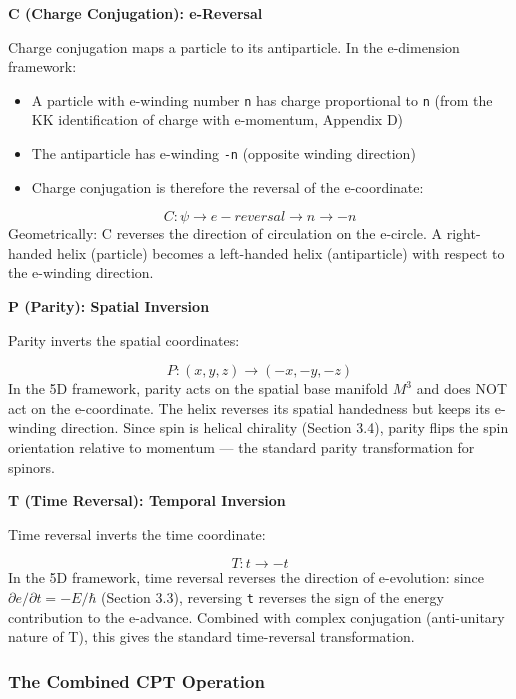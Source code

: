 \documentclass[aps,prd,preprint,superscriptaddress,longbibliography,floatfix]{revtex4-2}
\theoremstyle{remark}
\begin{document}
\textbf{C (Charge Conjugation): e-Reversal}

Charge conjugation maps a particle to its antiparticle. In the e-dimension framework:

\begin{itemize}
  \item A particle with e-winding number \texttt{n} has charge proportional to \texttt{n} (from the KK identification of charge with e-momentum, Appendix D)
  \item The antiparticle has e-winding \texttt{-n} (opposite winding direction)
  \item Charge conjugation is therefore the reversal of the e-coordinate:
\end{itemize}


\begin{equation}
    C: \psi \to e-reversal \to n \to -n
\end{equation}
Geometrically: C reverses the direction of circulation on the e-circle. A right-handed helix (particle) becomes a left-handed helix (antiparticle) with respect to the e-winding direction.

\textbf{P (Parity): Spatial Inversion}

Parity inverts the spatial coordinates:


\begin{equation}
    P: (x, y, z) \to (-x, -y, -z)
\end{equation}
In the 5D framework, parity acts on the spatial base manifold $M^{3}$ and does NOT act on the e-coordinate. The helix reverses its spatial handedness but keeps its e-winding direction. Since spin is helical chirality (Section 3.4), parity flips the spin orientation relative to momentum --- the standard parity transformation for spinors.

\textbf{T (Time Reversal): Temporal Inversion}

Time reversal inverts the time coordinate:


\begin{equation}
    T: t \to -t
\end{equation}
In the 5D framework, time reversal reverses the direction of e-evolution: since $\partial e/\partial t = -E/\hbar$ (Section 3.3), reversing \texttt{t} reverses the sign of the energy contribution to the e-advance. Combined with complex conjugation (anti-unitary nature of T), this gives the standard time-reversal transformation.


\subsubsection{The Combined CPT Operation}
\end{document}
